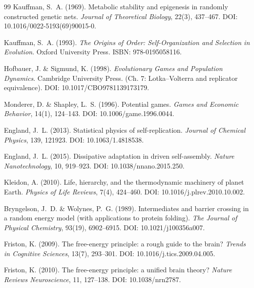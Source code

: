 \documentclass[12pt,a4paper]{article}
\theoremstyle{remark}
\begin{document}
\begin{thebibliography}{99}
Kauffman, S.~A. (1969).
\newblock Metabolic stability and epigenesis in randomly constructed genetic nets.
\newblock \textit{Journal of Theoretical Biology}, 22(3), 437--467.
\newblock DOI: 10.1016/0022-5193(69)90015-0.

Kauffman, S.~A. (1993).
\newblock \textit{The Origins of Order: Self-Organization and Selection in Evolution}.
\newblock Oxford University Press. ISBN: 978-0195058116.

Hofbauer, J. \& Sigmund, K. (1998).
\newblock \textit{Evolutionary Games and Population Dynamics}.
\newblock Cambridge University Press. (Ch. 7: Lotka--Volterra and replicator equivalence).
\newblock DOI: 10.1017/CBO9781139173179.

Monderer, D. \& Shapley, L.~S. (1996).
\newblock Potential games.
\newblock \textit{Games and Economic Behavior}, 14(1), 124--143.
\newblock DOI: 10.1006/game.1996.0044.

England, J.~L. (2013).
\newblock Statistical physics of self-replication.
\newblock \textit{Journal of Chemical Physics}, 139, 121923.
\newblock DOI: 10.1063/1.4818538.

England, J.~L. (2015).
\newblock Dissipative adaptation in driven self-assembly.
\newblock \textit{Nature Nanotechnology}, 10, 919--923.
\newblock DOI: 10.1038/nnano.2015.250.

Kleidon, A. (2010).
\newblock Life, hierarchy, and the thermodynamic machinery of planet Earth.
\newblock \textit{Physics of Life Reviews}, 7(4), 424--460.
\newblock DOI: 10.1016/j.plrev.2010.10.002.

Bryngelson, J.~D. \& Wolynes, P.~G. (1989).
\newblock Intermediates and barrier crossing in a random energy model (with applications to protein folding).
\newblock \textit{The Journal of Physical Chemistry}, 93(19), 6902--6915.
\newblock DOI: 10.1021/j100356a007.

Friston, K. (2009).
\newblock The free-energy principle: a rough guide to the brain?
\newblock \textit{Trends in Cognitive Sciences}, 13(7), 293--301.
\newblock DOI: 10.1016/j.tics.2009.04.005.

Friston, K. (2010).
\newblock The free-energy principle: a unified brain theory?
\newblock \textit{Nature Reviews Neuroscience}, 11, 127--138.
\newblock DOI: 10.1038/nrn2787.


\end{thebibliography}
\end{document}
